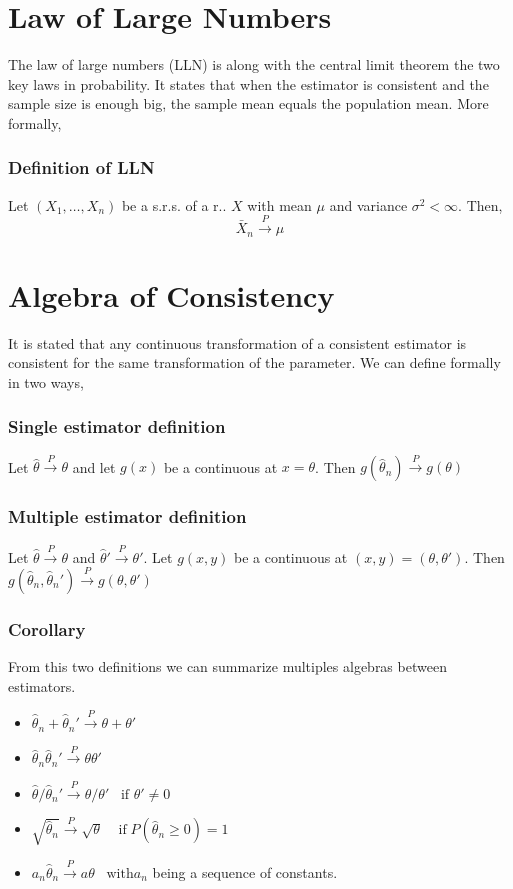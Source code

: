 \section{Law of Large Numbers}
The law of large numbers (LLN) is along with the central limit theorem the two
key laws in probability. It states that when the estimator is consistent and the
sample size is enough big, the sample mean equals the population mean. More
formally,
\subsubsection{Definition of LLN}
Let $(X_1,\dots,X_n)$ be a s.r.s. of a r.. $X$ with mean $\mu$ and variance
$\sigma^2<\infty$. Then,
\[ \bar{X}_n \xrightarrow{P} \mu \]

\section{Algebra of Consistency}
It is stated that any continuous transformation of a consistent estimator is
consistent for the same transformation of the parameter. We can define formally
in two ways,\\

\subsubsection{Single estimator definition}
Let $\hat{\theta}\xrightarrow{P}\theta$ and let $g(x)$ be a continuous at
$x=\theta$. Then $g(\hat{\theta}_n) \xrightarrow{P}g(\theta)$
\subsubsection{Multiple estimator definition}
Let $\hat{\theta}\xrightarrow{P}\theta$ and
$\hat{\theta}'\xrightarrow{P}\theta'$. Let $g(x,y)$ be a continuous at
$(x,y)=(\theta,\theta')$. Then $g(\hat{\theta}_n,\hat{\theta}_n')
\xrightarrow{P}g(\theta,\theta')$

\subsubsection{Corollary}
From this two definitions we can summarize multiples algebras between
estimators.
\begin{itemize}
    \item $\hat{\theta}_n + \hat{\theta}_n' \xrightarrow{P} \theta + \theta'$
    \item $\hat{\theta}_n\hat{\theta}_n' \xrightarrow{P} \theta\theta'$
    \item $\hat{\theta} / \hat{\theta}_n' \xrightarrow{P} \theta/ \theta' \;\;\;
    \text{if } \theta' \neq 0$
    \item $\sqrt{\hat{\theta}_n} \xrightarrow{P} \sqrt{\theta} \;\;\;\;
    \text{if}\; P(\hat{\theta}_n \geq 0) = 1$
    \item $a_n\hat{\theta}_n \xrightarrow{P} a\theta \;\;\; \text{with} a_n$
    being a sequence of constants. 
\end{itemize}

